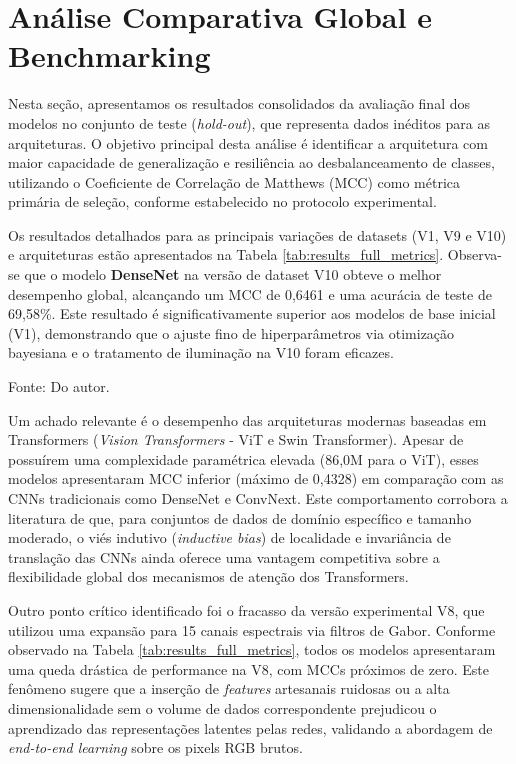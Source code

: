 \section{Análise Comparativa Global e Benchmarking}

Nesta seção, apresentamos os resultados consolidados da avaliação final dos modelos no conjunto de teste (\textit{hold-out}), que representa dados inéditos para as arquiteturas. O objetivo principal desta análise é identificar a arquitetura com maior capacidade de generalização e resiliência ao desbalanceamento de classes, utilizando o Coeficiente de Correlação de Matthews (MCC) como métrica primária de seleção, conforme estabelecido no protocolo experimental.

Os resultados detalhados para as principais variações de datasets (V1, V9 e V10) e arquiteturas estão apresentados na Tabela \ref{tab:results_full_metrics}. Observa-se que o modelo \textbf{DenseNet} na versão de dataset V10 obteve o melhor desempenho global, alcançando um MCC de 0,6461 e uma acurácia de teste de 69,58\%. Este resultado é significativamente superior aos modelos de base inicial (V1), demonstrando que o ajuste fino de hiperparâmetros via otimização bayesiana e o tratamento de iluminação na V10 foram eficazes.

\begin{table}[!h]
    \centering
    \begin{threeparttable}
    \caption{Métricas consolidadas de desempenho e complexidade no conjunto de teste.}
    \label{tab:results_full_metrics}
    
    \begin{tablenotes}
            \small 
            \item[] Fonte: Do autor.
        \end{tablenotes}
        \end{threeparttable}
\end{table}

Um achado relevante é o desempenho das arquiteturas modernas baseadas em Transformers (\textit{Vision Transformers} - ViT e Swin Transformer). Apesar de possuírem uma complexidade paramétrica elevada (86,0M para o ViT), esses modelos apresentaram MCC inferior (máximo de 0,4328) em comparação com as CNNs tradicionais como DenseNet e ConvNext. Este comportamento corrobora a literatura de que, para conjuntos de dados de domínio específico e tamanho moderado, o viés indutivo (\textit{inductive bias}) de localidade e invariância de translação das CNNs ainda oferece uma vantagem competitiva sobre a flexibilidade global dos mecanismos de atenção dos Transformers.

Outro ponto crítico identificado foi o fracasso da versão experimental V8, que utilizou uma expansão para 15 canais espectrais via filtros de Gabor. Conforme observado na Tabela \ref{tab:results_full_metrics}, todos os modelos apresentaram uma queda drástica de performance na V8, com MCCs próximos de zero. Este fenômeno sugere que a inserção de \textit{features} artesanais ruidosas ou a alta dimensionalidade sem o volume de dados correspondente prejudicou o aprendizado das representações latentes pelas redes, validando a abordagem de \textit{end-to-end learning} sobre os pixels RGB brutos.
